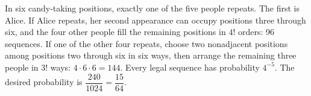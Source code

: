 In six candy-taking positions, exactly one of the five people repeats. The first is Alice. If Alice repeats, her second appearance can occupy positions three through six, and the four other people fill the remaining positions in $4!$ orders: 96 sequences. If one of the other four repeats, choose two nonadjacent positions among positions two through six in six ways, then arrange the remaining three people in $3!$ ways: $4\cdot6\cdot6=144$. Every legal sequence has probability $4^{-5}$. The desired probability is $\dfrac{240}{1024}=\boxed{\dfrac{15}{64}}$.
